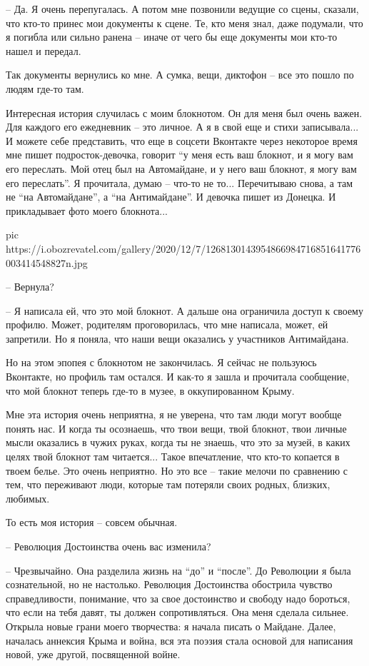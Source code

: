 – Да. Я очень перепугалась. А потом мне позвонили ведущие со сцены, сказали,
что кто-то принес мои документы к сцене. Те, кто меня знал, даже подумали, что
я погибла или сильно ранена – иначе от чего бы еще документы мои кто-то нашел и
передал.

Так документы вернулись ко мне. А сумка, вещи, диктофон – все это пошло по
людям где-то там.

Интересная история случилась с моим блокнотом. Он для меня был очень важен. Для
каждого его ежедневник – это личное. А я в свой еще и стихи записывала... И
можете себе представить, что еще в соцсети Вконтакте через некоторое время мне
пишет подросток-девочка, говорит \enquote{у меня есть ваш блокнот, и я могу вам его
переслать. Мой отец был на Автомайдане, и у него ваш блокнот, я могу вам его
переслать}. Я прочитала, думаю – что-то не то... Перечитываю снова, а там не
\enquote{на Автомайдане}, а \enquote{на Антимайдане}. И девочка пишет из Донецка. И
прикладывает фото моего блокнота...

\ifcmt
pic https://i.obozrevatel.com/gallery/2020/12/7/1268130143954866984716851641776003414548827n.jpg
\fi

– Вернула?

– Я написала ей, что это мой блокнот. А дальше она ограничила доступ к своему
профилю. Может, родителям проговорилась, что мне написала, может, ей запретили.
Но я поняла, что наши вещи оказались у участников Антимайдана.

Но на этом эпопея с блокнотом не закончилась. Я сейчас не пользуюсь Вконтакте,
но профиль там остался. И как-то я зашла и прочитала сообщение, что мой блокнот
теперь где-то в музее, в оккупированном Крыму.

Мне эта история очень неприятна, я не уверена, что там люди могут вообще понять
нас. И когда ты осознаешь, что твои вещи, твой блокнот, твои личные мысли
оказались в чужих руках, когда ты не знаешь, что это за музей, в каких целях
твой блокнот там читается... Такое впечатление, что кто-то копается в твоем
белье. Это очень неприятно. Но это все – такие мелочи по сравнению с тем, что
переживают люди, которые там потеряли своих родных, близких, любимых.

То есть моя история – совсем обычная.

– Революция Достоинства очень вас изменила?

– Чрезвычайно. Она разделила жизнь на \enquote{до} и \enquote{после}. До Революции я была
сознательной, но не настолько. Революция Достоинства обострила чувство
справедливости, понимание, что за свое достоинство и свободу надо бороться, что
если на тебя давят, ты должен сопротивляться. Она меня сделала сильнее. Открыла
новые грани моего творчества: я начала писать о Майдане. Далее, началась
аннексия Крыма и война, вся эта поэзия стала основой для написания новой, уже
другой, посвященной войне.

